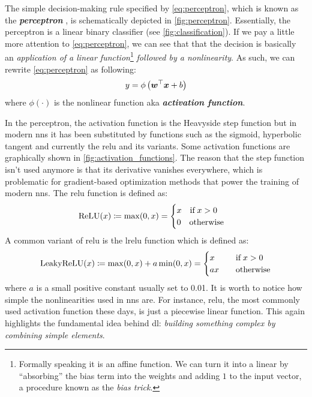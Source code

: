 The simple decision-making rule specified by \Equation{} \ref{eq:perceptron}, which
is known as the \emph{\textbf{perceptron}}
\parencite{Rosenblatt1957}, is schematically depicted in \Figure{}
\ref{fig:perceptron}. Essentially, the perceptron is a linear binary
classifier (see
\Figure{} \ref{fig:classification}). If we pay a little more attention to
\Equation{} \ref{eq:perceptron}, we can see that that the decision is basically
an \emph{application of a linear function}\footnote{Formally speaking it is an affine function.
We can turn it into a linear by ``absorbing'' the bias term into the weights and
adding $1$ to the input vector, a procedure known as the \emph{bias
trick}.} \emph{followed by a
nonlinearity}. As such, we can rewrite \Equation{}
\ref{eq:perceptron} as following:
\begin{equation}
	\label{eq:neuron}
	y = \phi\left(\boldsymbol{w}^\top \boldsymbol{x} + b\right)
\end{equation}
where $\phi(\cdot)$ is the nonlinear function aka \emph{\textbf{activation
function}}.

In the perceptron, the activation function is the Heavyside step
function but in modern \glspl{nn} it has
been substituted by functions such as the sigmoid, hyperbolic
tangent and currently the \gls{relu}
and its variants. Some activation functions are graphically shown in \Figure{}
\ref{fig:activation_functions}. The reason that the step function isn't used
anymore is that its derivative vanishes everywhere, which is
problematic for gradient-based optimization methods  that power the training of modern \glspl{nn}. The \gls{relu}
function is defined as:
\begin{equation}
	\operatorname*{ReLU}(x) \coloneqq
	\max(0, x) =
	\begin{cases}
		x \quad \text{if}\; x > 0 \\
		0 \quad \text{otherwise}
	\end{cases}
\end{equation}
A common variant of \gls{relu} is the \gls{lrelu}
function which is defined as:
\begin{align}
	\operatorname*{LeakyReLU}(x) \coloneqq
	\max(0, x) + a\min(0, x)=
	\begin{cases}
		x \quad & \text{if}\; x > 0 \\
		ax \quad & \text{otherwise} \\
	\end{cases}
\end{align}
where $a$ is a small positive constant usually set to \num{0.01}. It is worth to
notice how simple the nonlinearities used in \glspl{nn} are. For instance,
\gls{relu}, the most commonly used activation function these days, is just a
piecewise linear function. This again
highlights the fundamental idea behind \gls{dl}: \emph{building something
complex by combining simple elements}.

